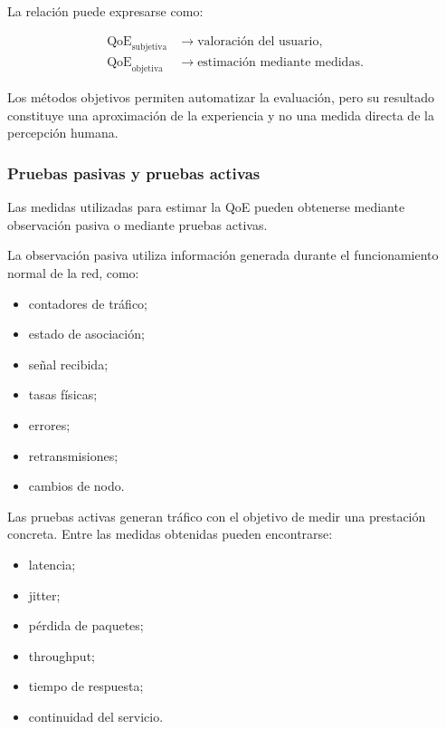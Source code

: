 La relación puede expresarse como:

\[
\begin{aligned}
    \mathrm{QoE}_{\mathrm{subjetiva}}
    &\longrightarrow
    \text{valoración del usuario},\\
    \mathrm{QoE}_{\mathrm{objetiva}}
    &\longrightarrow
    \text{estimación mediante medidas}.
\end{aligned}
\]

Los métodos objetivos permiten automatizar la evaluación, pero su
resultado constituye una aproximación de la experiencia y no una medida
directa de la percepción humana.


\subsubsection*{Pruebas pasivas y pruebas activas}

Las medidas utilizadas para estimar la QoE pueden obtenerse mediante
observación pasiva o mediante pruebas activas.

La observación pasiva utiliza información generada durante el
funcionamiento normal de la red, como:

\begin{itemize}
    \item contadores de tráfico;

    \item estado de asociación;

    \item señal recibida;

    \item tasas físicas;

    \item errores;

    \item retransmisiones;

    \item cambios de nodo.
\end{itemize}

Las pruebas activas generan tráfico con el objetivo de medir una
prestación concreta. Entre las medidas obtenidas pueden encontrarse:

\begin{itemize}
    \item latencia;

    \item jitter;

    \item pérdida de paquetes;

    \item throughput;

    \item tiempo de respuesta;

    \item continuidad del servicio.
\end{itemize}

